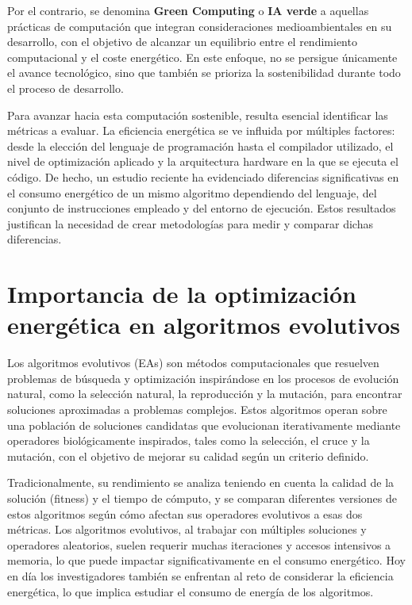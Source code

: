 Por el contrario, se denomina \textbf{Green Computing} o \textbf{IA verde} a aquellas prácticas de computación que integran consideraciones medioambientales en su desarrollo, con el objetivo de alcanzar un equilibrio entre el rendimiento computacional y el coste energético. En este enfoque, no se persigue únicamente el avance tecnológico, sino que también se prioriza la sostenibilidad durante todo el proceso de desarrollo. \cite{zhou2023opportunities}

Para avanzar hacia esta computación sostenible, resulta esencial identificar las métricas a evaluar. La eficiencia energética se ve influida por múltiples factores: desde la elección del lenguaje de programación hasta el compilador utilizado, el nivel de optimización aplicado y la arquitectura hardware en la que se ejecuta el código. De hecho, un estudio reciente ha evidenciado diferencias significativas en el consumo energético de un mismo algoritmo dependiendo del lenguaje, del conjunto de instrucciones empleado y del entorno de ejecución. Estos resultados justifican la necesidad de crear metodologías para medir y comparar dichas diferencias. \cite{lutz2021energy}

\section{Importancia de la optimización energética en algoritmos evolutivos}

Los algoritmos evolutivos (EAs) son métodos computacionales que resuelven problemas de búsqueda y optimización inspirándose en los procesos de evolución natural, como la selección natural, la reproducción y la mutación, para encontrar soluciones aproximadas a problemas complejos. Estos algoritmos operan sobre una población de soluciones candidatas que evolucionan iterativamente mediante operadores biológicamente inspirados, tales como la selección, el cruce y la mutación, con el objetivo de mejorar su calidad según un criterio definido.

Tradicionalmente, su rendimiento se analiza teniendo en cuenta la calidad de la solución (fitness) y el tiempo de cómputo, y se comparan diferentes versiones de estos algoritmos según cómo afectan sus operadores evolutivos a esas dos métricas. Los algoritmos evolutivos, al trabajar con múltiples soluciones y operadores aleatorios, suelen requerir muchas iteraciones y accesos intensivos a memoria, lo que puede impactar significativamente en el consumo energético. Hoy en día los investigadores también se enfrentan al reto de considerar la eficiencia energética, lo que implica estudiar el consumo de energía de los algoritmos.

